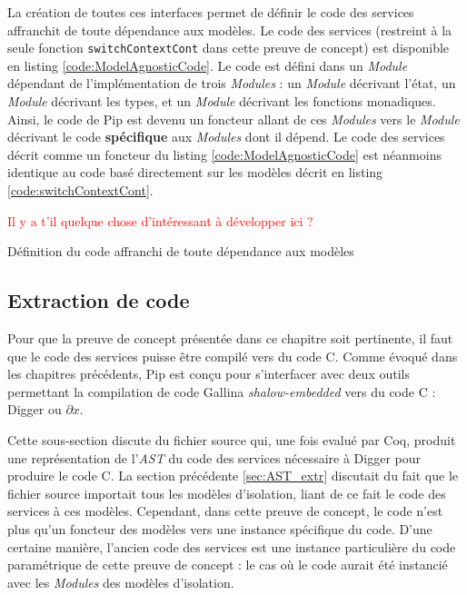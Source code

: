			La création de toutes ces interfaces permet de définir le code des services affranchit de toute dépendance aux modèles. Le code des services (restreint à la seule fonction \texttt{switchContextCont} dans cette preuve de concept) est disponible en listing \ref{code:ModelAgnosticCode}. Le code est défini dans un \emph{Module} dépendant de l'implémentation de trois \emph{Modules} : un \emph{Module} décrivant l'état, un \emph{Module} décrivant les types, et un \emph{Module} décrivant les fonctions monadiques. Ainsi, le code de Pip est devenu un foncteur allant de ces \emph{Modules} vers le \emph{Module} décrivant le code \textbf{spécifique} aux \emph{Modules} dont il dépend. Le code des services décrit comme un foncteur du listing \ref{code:ModelAgnosticCode} est néanmoins identique au code basé directement sur les modèles décrit en listing \ref{code:switchContextCont}.

			\textcolor{red}{Il y a t'il quelque chose d'intéressant à développer ici ?}

			\begin{listing}[!ht]
				\caption{Définition du code affranchi de toute dépendance aux modèles}
				\label{code:ModelAgnosticCode}
			\end{listing}

		\subsection{Extraction de code}

		Pour que la preuve de concept présentée dans ce chapitre soit pertinente, il faut que le code des services puisse être compilé vers du code C. Comme évoqué dans les chapitres précédents, Pip est conçu pour s'interfacer avec deux outils permettant la compilation de code Gallina \emph{shalow-embedded} vers du code C : Digger ou $\partial x$.

		Cette sous-section discute du fichier source qui, une fois evalué par Coq, produit une représentation de l'\emph{AST} du code des services nécessaire à Digger pour produire le code C. La section précédente \ref{sec:AST_extr} discutait du fait que le fichier source importait tous les modèles d'isolation, liant de ce fait le code des services à ces modèles. Cependant, dans cette preuve de concept, le code n'est plus qu'un foncteur des modèles vers une instance spécifique du code. D'une certaine manière, l'ancien code des services est une instance particulière du code paramétrique de cette preuve de concept : le cas où le code aurait été instancié avec les \emph{Modules} des modèles d'isolation.

